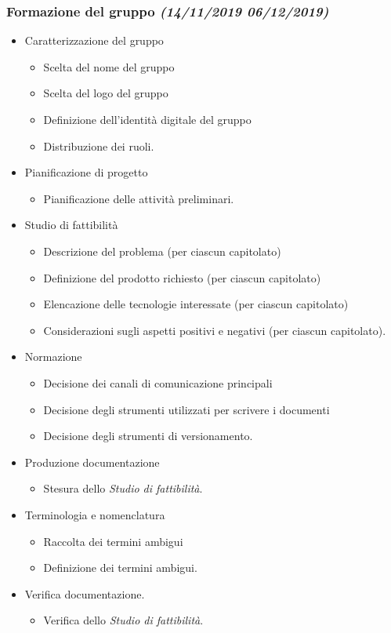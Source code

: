 \documentclass[../piano-di-progetto.tex]{subfiles}
\begin{document}
\subsubsection[Formazione del gruppo]{Formazione del gruppo {\normalsize\normalfont\itshape(14/11/2019  06/12/2019)}}%
\label{subs:formazione_del_gruppo}
\begin{itemize}
  \item Caratterizzazione del gruppo
  \begin{itemize}
    \item Scelta del nome del gruppo
    \item Scelta del logo del gruppo
    \item Definizione dell'identità digitale del gruppo
    \item Distribuzione dei ruoli.
  \end{itemize}
  \item Pianificazione di progetto
  \begin{itemize}
    \item Pianificazione delle attività preliminari.
  \end{itemize}
  \item Studio di fattibilità
  \begin{itemize}
    \item Descrizione del problema (per ciascun capitolato)
    \item Definizione del prodotto richiesto (per ciascun capitolato)
    \item Elencazione delle tecnologie interessate (per ciascun capitolato)
    \item Considerazioni sugli aspetti positivi e negativi (per ciascun capitolato).
  \end{itemize}
  \item Normazione
  \begin{itemize}
    \item Decisione dei canali di comunicazione principali
    \item Decisione degli strumenti utilizzati per scrivere i documenti
    \item Decisione degli strumenti di versionamento.
  \end{itemize}
  \item Produzione documentazione
  \begin{itemize}
    \item Stesura dello \textit{Studio di fattibilità}.
  \end{itemize}
  \item Terminologia e nomenclatura
  \begin{itemize}
    \item Raccolta dei termini ambigui
    \item Definizione dei termini ambigui.
  \end{itemize}
  \item Verifica documentazione.
  \begin{itemize}
    \item Verifica dello \textit{Studio di fattibilità}.
  \end{itemize}
\end{itemize}
\end{document}
